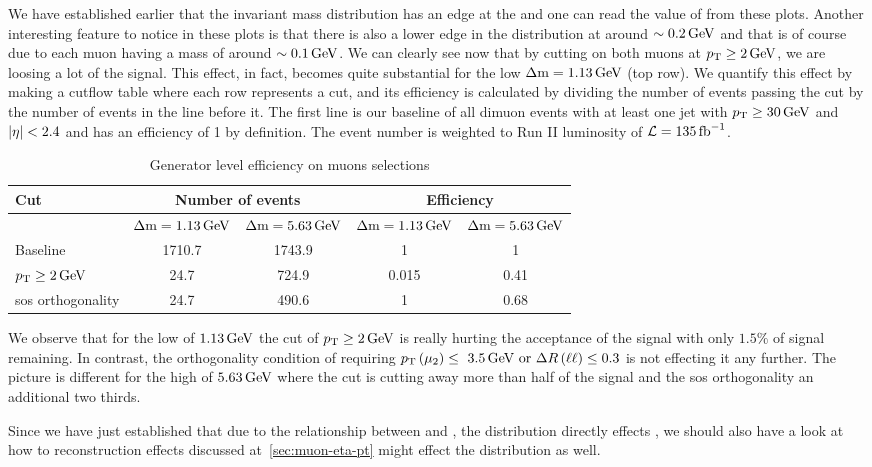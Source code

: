 We have established earlier that the invariant mass distribution has an edge at the \dm and one can read the value of \dm from these plots. Another interesting feature to notice in these plots is that there is also a lower edge in the \dm distribution at around $\sim 0.2\,\text{Ge\hspace{-.08em}V}$ and that is of course due to each muon having a mass of around $\sim 0.1\,\text{Ge\hspace{-.08em}V}$. We can clearly see now that by cutting on both muons at $p_{\mathrm{T}}\geq 2\,\text{Ge\hspace{-.08em}V}$, we are loosing a lot of the signal. This effect, in fact, becomes quite substantial for the low $\Delta\mathrm{m}=1.13\,\text{Ge\hspace{-.08em}V}$ (top row). We quantify this effect by making a cutflow table where each row represents a cut, and its efficiency is calculated by dividing the number of events passing the cut by the number of events in the line before it. The first line is our baseline of all dimuon events with at least one jet with $p_{\mathrm{T}} \geq 30\,\text{Ge\hspace{-.08em}V}$ and $\lvert \eta \rvert<2.4$ and has an efficiency of 1 by definition. The event number is weighted to Run II luminosity of $\mathcal{L} = 135 \mbox{\ensuremath{\,\text{fb}^{-1}}}$.

\begin{table}[hp]
	\centering
	\label{tab:gen-muon-pt-dr-efficiency}
		\caption{Generator level efficiency on muons selections}
			\begin{tabular}{l|cc|cc} \hline
			Cut & \multicolumn{2}{c|}{Number of events} & \multicolumn{2}{c}{Efficiency} \\ \hline
			
			 & $\Delta\mathrm{m}=1.13\,\text{Ge\hspace{-.08em}V}$ & $\Delta\mathrm{m}=5.63\,\text{Ge\hspace{-.08em}V}$ & $\Delta\mathrm{m}=1.13\,\text{Ge\hspace{-.08em}V}$ & $\Delta\mathrm{m}=5.63\,\text{Ge\hspace{-.08em}V}$ \\
			Baseline & 1710.7 & 1743.9 & 1 & 1\\
			$p_{\mathrm{T}}\geq 2\,\text{Ge\hspace{-.08em}V}$ & 24.7 & 724.9 & 0.015 & 0.41\\
			\gls{sos} orthogonality & 24.7 & 490.6 & 1 & 0.68 \\ \hline
			\end{tabular}
\end{table}

We observe that for the low \dm of $1.13\,\text{Ge\hspace{-.08em}V}$ the cut of $p_{\mathrm{T}}\geq 2\,\text{Ge\hspace{-.08em}V}$ is really hurting the acceptance of the signal with only $1.5\%$ of signal remaining. In contrast, the orthogonality condition of requiring $p_{\mathrm{T}}\left(\mu_2\right)\leq~3.5\,\text{Ge\hspace{-.08em}V}\text{ or }\Delta R\left(\ell\ell\right)\leq 0.3$ is not effecting it any further. The picture is different for the high \dm of $5.63\,\text{Ge\hspace{-.08em}V}$ where the \pt cut is cutting away more than half of the signal and the \gls{sos} orthogonality an additional two thirds.

Since we have just established that due to the relationship between \pt and \mll, the \pt distribution directly effects \mll, we should also have a look at how to reconstruction effects discussed at~\ref{sec:muon-eta-pt} might effect the \mmumu distribution as well.

